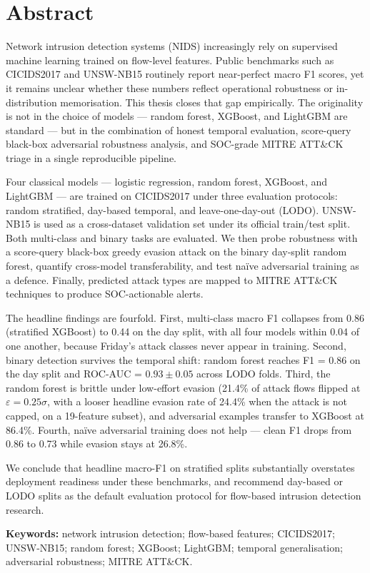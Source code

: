 \chapter*{Abstract}

Network intrusion detection systems (NIDS) increasingly rely on supervised
machine learning trained on flow-level features. Public benchmarks such as
CICIDS2017 and UNSW-NB15 routinely report near-perfect macro F1 scores, yet
it remains unclear whether these numbers reflect operational robustness or
in-distribution memorisation. This thesis closes that gap empirically. The
originality is not in the choice of models --- random forest, XGBoost, and
LightGBM are standard --- but in the combination of honest temporal
evaluation, score-query black-box adversarial robustness analysis, and
SOC-grade MITRE ATT\&CK triage in a single reproducible pipeline.

Four classical models --- logistic regression, random forest, XGBoost, and
LightGBM --- are trained on CICIDS2017 under three evaluation protocols:
random stratified, day-based temporal, and leave-one-day-out (LODO).
UNSW-NB15 is used as a cross-dataset validation set under its official
train/test split. Both multi-class and binary tasks are evaluated. We then
probe robustness with a score-query black-box greedy evasion attack on the
binary day-split random forest, quantify cross-model transferability, and
test naïve adversarial training as a defence. Finally, predicted attack
types are mapped to MITRE ATT\&CK techniques to produce SOC-actionable
alerts.

The headline findings are fourfold. First, multi-class macro F1 collapses
from 0.86 (stratified XGBoost) to 0.44 on the day split, with all four
models within 0.04 of one another, because Friday's attack classes never
appear in training. Second, binary detection survives the temporal shift:
random forest reaches F1 = 0.86 on the day split and ROC-AUC = $0.93 \pm
0.05$ across LODO folds. Third, the random forest is brittle under
low-effort evasion (21.4\% of attack flows flipped at $\varepsilon =
0.25\sigma$, with a looser headline evasion rate of 24.4\% when the attack
is not capped, on a 19-feature subset), and adversarial examples transfer
to XGBoost at 86.4\%. Fourth, naïve adversarial training does not help ---
clean F1 drops from 0.86 to 0.73 while evasion stays at 26.8\%.

We conclude that headline macro-F1 on stratified splits substantially
overstates deployment readiness under these benchmarks, and recommend
day-based or LODO splits as the default evaluation protocol for flow-based
intrusion detection research.

\bigskip
\noindent\textbf{Keywords:} network intrusion detection; flow-based features; CICIDS2017; UNSW-NB15; random forest; XGBoost; LightGBM; temporal generalisation; adversarial robustness; MITRE ATT\&CK.
